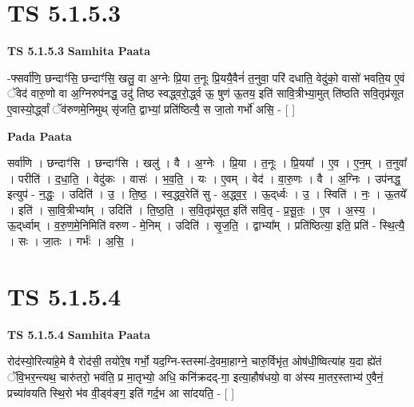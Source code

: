 \documentclass[17pt]{extarticle}
\begin{document}

\section{ TS 5.1.5.3 }

\textbf{TS 5.1.5.3 } \newline
\textbf{Samhita Paata} \newline

-फ्सर्वा॑णि॒ छन्दाꣳ॑सि॒ छन्दाꣳ॑सि॒ खलु॒ वा अ॒ग्नेः प्रि॒या त॒नूः प्रि॒ययै॒वैनं॑ त॒नुवा॒ परि॑ दधाति॒ वेदु॑को॒ वासो॑ भवति॒य ए॒वं ॅवेद॑ वारु॒णो वा अ॒ग्निरुप॑नद्ध॒ उदु॑ तिष्ठ स्वद्ध्वरो॒र्द्ध्व ऊ॒ षुण॑ ऊ॒तय॒ इति॑ सावि॒त्रीभ्या॒मुत् ति॑ष्ठति सवि॒तृप्र॑सूत ए॒वास्यो॒र्द्ध्वां ॅव॑रुणमे॒निमुथ् सृ॑जति॒ द्वाभ्यां॒ प्रति॑ष्ठित्यै॒ स जा॒तो गर्भो॑ असि॒ - [  ] \newline

\textbf{Pada Paata} \newline

सर्वा॑णि । छन्दाꣳ॑सि । छन्दाꣳ॑सि । खलु॑ । वै । अ॒ग्नेः । प्रि॒या । त॒नूः । प्रि॒यया᳚ । ए॒व । ए॒न॒म् । त॒नुवा᳚ । परीति॑ । द॒धा॒ति॒ । वेदु॑कः । वासः॑ । भ॒व॒ति॒ । यः । ए॒वम् । वेद॑ । वा॒रु॒णः । वै । अ॒ग्निः । उप॑नद्ध॒ इत्युप॑ - न॒द्धः॒ । उदिति॑ । उ॒ । ति॒ष्ठ॒ । स्व॒द्ध्व॒रेति॑ सु - अ॒द्ध्व॒र॒ । ऊ॒द्‌र्ध्वः । उ॒ । स्विति॑ । नः॒ । ऊ॒तये᳚ । इति॑ । सा॒वि॒त्रीभ्या᳚म् । उदिति॑ । ति॒ष्ठ॒ति॒ । स॒वि॒तृप्र॑सूत॒ इति॑ सवि॒तृ - प्र॒सू॒तः॒ । ए॒व । अ॒स्य॒ । ऊ॒द्‌र्ध्वाम् । व॒रु॒ण॒मे॒निमिति॑ वरुण - मे॒निम् । उदिति॑ । सृ॒ज॒ति॒ । द्वाभ्या᳚म् । प्रति॑ष्ठित्या॒ इति॒ प्रति॑ - स्थि॒त्यै॒ । सः । जा॒तः । गर्भः॑ । अ॒सि॒ ।  \newline





\section{ TS 5.1.5.4 }

\textbf{TS 5.1.5.4 } \newline
\textbf{Samhita Paata} \newline

रोद॑स्यो॒रित्या॑हे॒मे वै रोद॑सी॒ तयो॑रे॒ष गर्भो॒ यद॒ग्नि-स्तस्मा॑-दे॒वमा॒हाग्ने॒ चारु॒र्विभृ॑त॒ ओष॑धी॒ष्वित्या॑ह य॒दा ह्ये॑तं ॅवि॒भर॒न्त्यथ॒ चारु॑तरो॒ भव॑ति॒ प्र मा॒तृभ्यो॒ अधि॒ कनि॑क्रदद्-गा॒ इत्या॒हौष॑धयो॒ वा अ॑स्य मा॒तर॒स्ताभ्य॑ ए॒वैनं॒ प्रच्या॑वयति स्थि॒रो भ॑व वी॒ड्व॑ङ्ग॒ इति॑ गर्द॒भ आ सा॑दयति॒ - [  ] \newline
\end{document}
